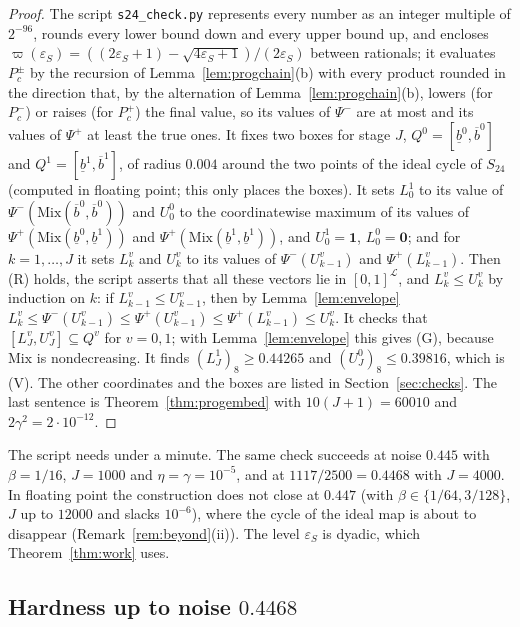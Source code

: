 \documentclass[11pt]{amsart}
\theoremstyle{definition}
\theoremstyle{remark}
\newcommand{\eps}{\varepsilon}
\begin{document}
\begin{proof}
The script \texttt{s24\_check.py} represents every number as an integer multiple of $2^{-96}$,
rounds every lower bound down and every upper bound up, and encloses
$\varpi(\eps_S)=((2\eps_S+1)-\sqrt{4\eps_S+1})/(2\eps_S)$ between rationals; it evaluates
$P^\pm_c$ by the recursion of Lemma~\ref{lem:progchain}(b) with every product rounded in the
direction that, by the alternation of Lemma~\ref{lem:progchain}(b), lowers (for $P^-_c$) or raises
(for $P^+_c$) the final value, so its values of $\Psi^-$ are at most and its values of $\Psi^+$ at
least the true ones. It fixes two boxes
for stage $J$, $Q^0=[\underline b^0,\overline b^0]$ and $Q^1=[\underline b^1,\overline b^1]$, of
radius $0.004$ around the two points of the ideal cycle of $S_{24}$ (computed in floating point;
this only places the boxes). It sets $L^1_0$ to its value of
$\Psi^-(\mathrm{Mix}(\overline b^0,\overline b^0))$ and $U^0_0$ to the coordinatewise maximum of its values of
$\Psi^+(\mathrm{Mix}(\underline b^0,\underline b^1))$ and $\Psi^+(\mathrm{Mix}(\underline b^1,\underline b^1))$, and
$U^1_0=\mathbf 1$, $L^0_0=\mathbf 0$; and for $k=1,\dots,J$ it sets $L^v_k$ and $U^v_k$ to its
values of $\Psi^-(U^v_{k-1})$ and $\Psi^+(L^v_{k-1})$. Then (R) holds, the script asserts that all
these vectors lie in $[0,1]^{\mathcal L}$, and $L^v_k\le U^v_k$ by induction on $k$: if
$L^v_{k-1}\le U^v_{k-1}$, then by Lemma~\ref{lem:envelope}
$L^v_k\le\Psi^-(U^v_{k-1})\le\Psi^+(U^v_{k-1})\le\Psi^+(L^v_{k-1})\le U^v_k$. It checks that
$[L^v_J,U^v_J]\subseteq Q^v$ for $v=0,1$; with Lemma~\ref{lem:envelope} this gives (G), because $\mathrm{Mix}$ is
nondecreasing. It finds $(L^1_J)_8\ge0.44265$ and $(U^0_J)_8\le0.39816$, which is (V). The other
coordinates and the boxes are listed in Section~\ref{sec:checks}. The last sentence is
Theorem~\ref{thm:progembed} with $10(J+1)=60010$ and $2\gamma^2=2\cdot10^{-12}$.
\end{proof}

\noindent The script needs under a minute. The same check succeeds at noise $0.445$ with
$\beta=1/16$, $J=1000$ and $\eta=\gamma=10^{-5}$, and at $1117/2500=0.4468$ with $J=4000$. In
floating point the construction does not close at $0.447$ (with $\beta\in\{1/64,3/128\}$, $J$ up to
$12000$ and slacks $10^{-6}$), where the cycle of the ideal map is about to disappear
(Remark~\ref{rem:beyond}(ii)). The level $\eps_S$ is dyadic, which Theorem~\ref{thm:work} uses.

\subsection{Hardness up to noise \texorpdfstring{$0.4468$}{0.4468}}
\end{document}
